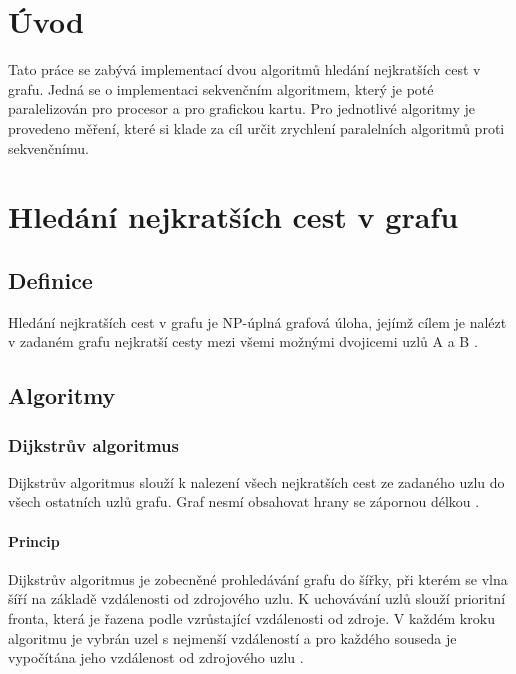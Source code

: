 
\clearpage


\section{Úvod}
Tato práce se zabývá implementací dvou algoritmů hledání nejkratších cest v grafu. Jedná se o implementaci sekvenčním algoritmem, který je poté paralelizován pro procesor a pro grafickou kartu. Pro jednotlivé algoritmy je provedeno měření, které si klade za cíl určit zrychlení paralelních algoritmů proti sekvenčnímu.

\section{Hledání nejkratších cest v grafu} \label{ncg}
\subsection{Definice} \label{l:clondike:ncgdef}
Hledání nejkratších cest v grafu je NP-úplná grafová úloha, jejímž cílem je nalézt v zadaném grafu nejkratší cesty mezi všemi možnými dvojicemi uzlů A a B \cite{w:ncg}.

\subsection{Algoritmy}
\subsubsection{Dijkstrův algoritmus}
Dijkstrův algoritmus slouží k nalezení všech nejkratších cest ze zadaného uzlu do všech ostatních uzlů grafu. Graf nesmí obsahovat hrany se zápornou délkou \cite{w:dij:def}.

\paragraph{Princip}
Dijkstrův algoritmus je zobecněné prohledávání grafu do šířky, při kterém se vlna šíří na základě vzdálenosti od zdrojového uzlu. K uchovávání uzlů slouží prioritní fronta, která je řazena podle vzrůstající vzdálenosti od zdroje. V každém kroku algoritmu je vybrán uzel s nejmenší vzdáleností a pro každého souseda je vypočítána jeho vzdálenost od zdrojového uzlu \cite{w:dij:def}.

